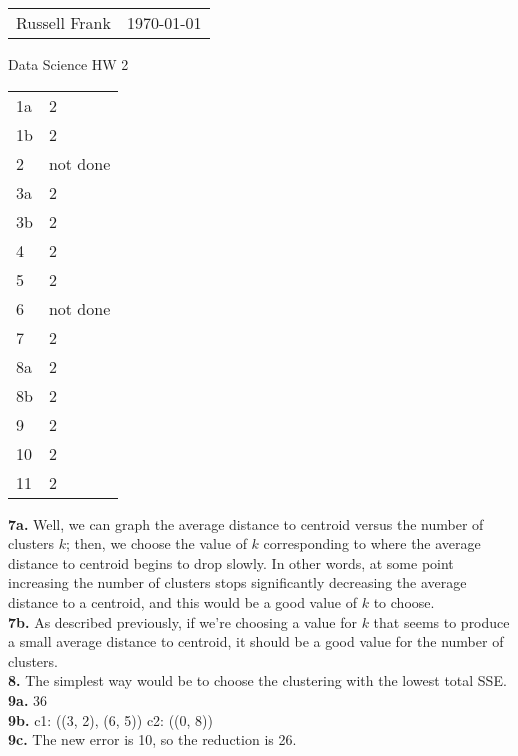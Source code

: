 \documentclass[10pt]{amsart}
\makeatletter
\newcommand{\head}[1]{
   \begin{tabular*}{7.1in}{@{}l@{\extracolsep{\fill}}r}
      Russell Frank & \today \\
   \end{tabular*}
   \begin{center} \LARGE #1 \normalsize \end{center}
   \vskip 0.1in
}
\makeatother
\begin{document}
\head{Data Science HW 2}

\begin{center}

\begin{tabular}{l|l}
  1a & 2 \\
  1b & 2 \\
  2 & not done \\
  3a & 2 \\
  3b & 2 \\
  4 & 2 \\
  5 & 2 \\
  6 & not done \\
  7 & 2 \\
  8a & 2 \\
  8b & 2 \\
  9 & 2 \\
  10 & 2 \\
  11 & 2 \\
\end{tabular}

\end{center}

\newpage

\textbf{7a.} Well, we can graph the average distance to centroid versus the 
number of clusters $k$; then, we choose the value of $k$ corresponding to 
where the average distance to centroid begins to drop slowly. In other words,
at some point increasing the number of clusters stops significantly decreasing
the average distance to a centroid, and this would be a good value of $k$ to
choose. \\

\textbf{7b.} As described previously, if we're choosing a value for $k$ that
seems to produce a small average distance to centroid, it should be a good 
value for the number of clusters. \\

\textbf{8.} The simplest way would be to choose the clustering with the lowest
total SSE. \\

\textbf{9a.} 36 \\

\textbf{9b.} c1: ((3, 2), (6, 5))   c2: ((0, 8)) \\

\textbf{9c.} The new error is 10, so the reduction is 26. \\
\end{document}
